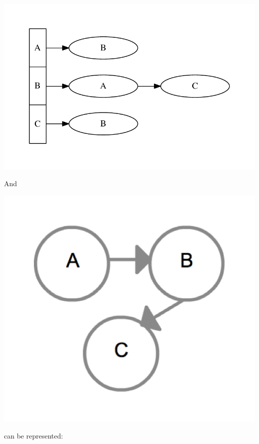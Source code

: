 {
  \includegraphics[scale=0.7]{AdjacencyList}
  \label{fig:AdjacencyList}
}

And

{
  \includegraphics[scale=0.2]{DiGraph}
  \label{fig:DiGraph}
}

can be represented:

